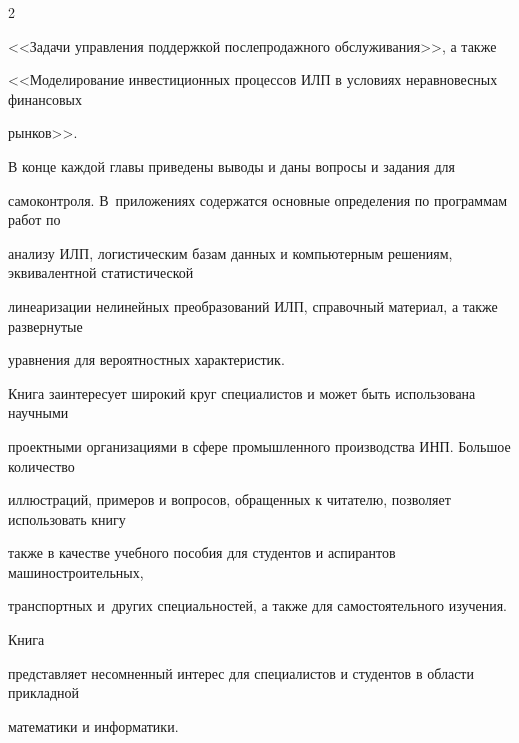 \begin{multicols}{2}
{{<<Задачи управления поддержкой послепродажного обслуживания>>, а также 


<<Моделирование инвестиционных процессов ИЛП в условиях неравновесных финансовых 


рынков>>. 


   


      В конце каждой главы приведены выводы и даны вопросы и задания для 


самоконтроля. В~приложениях содержатся основные определения по программам работ по 


анализу ИЛП, логистическим базам данных и компьютерным решениям, эквивалентной статистической 


линеаризации нелинейных преобразований ИЛП, справочный материал, а также развернутые 


уравнения для вероятностных характеристик.








      \def\leftkol{РЕЦЕНЗИИ}





\def\rightkol{РЕЦЕНЗИИ} 





      


      Книга заинтересует широкий круг специалистов и может быть использована научными 


проектными организациями в сфере промышленного производства ИНП. Большое количество 


иллюстраций, примеров и вопросов, обращенных к читателю, позволяет использовать книгу 


также в качестве учебного пособия для студентов и аспирантов машиностроительных, 


транспортных и~других специальностей, а также для самостоятельного изучения. 


{%





}





Книга 


представляет несомненный интерес для специалистов и студентов в области прикладной 


математики и информатики.


    





}





}


\end{multicols}







